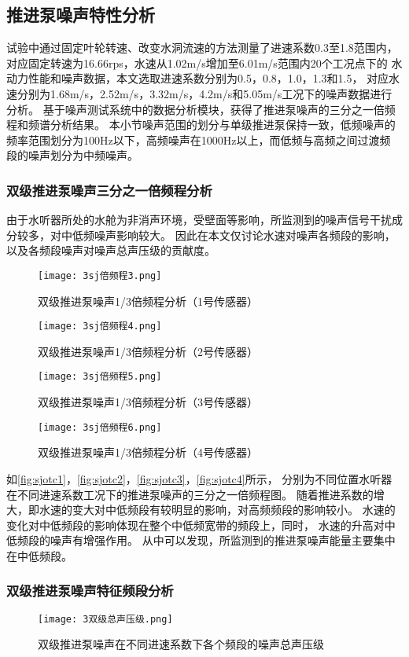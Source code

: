 \subsection{推进泵噪声特性分析}
试验中通过固定叶轮转速、改变水洞流速的方法测量了进速系数0.3至1.8范围内，
对应固定转速为16.66rps，水速从1.02m/s增加至6.01m/s范围内20个工况点下的
水动力性能和噪声数据，本文选取进速系数分别为0.5，0.8，1.0，1.3和1.5，
对应水速分别为1.68m/s，2.52m/s，3.32m/s，4.2m/s和5.05m/s工况下的噪声数据进行分析。
基于噪声测试系统中的数据分析模块，获得了推进泵噪声的三分之一倍频程和频谱分析结果。
本小节噪声范围的划分与单级推进泵保持一致，低频噪声的频率范围划分为100Hz以下，高频噪声在1000Hz以上，而低频与高频之间过渡频
段的噪声划分为中频噪声。
\subsubsection{双级推进泵噪声三分之一倍频程分析}
由于水听器所处的水舱为非消声环境，受壁面等影响，所监测到的噪声信号干扰成分较多，对中低频噪声影响较大。
因此在本文仅讨论水速对噪声各频段的影响，以及各频段噪声对噪声总声压级的贡献度。
\begin{figure}[htbp]
    \centering
    \texttt{[image: 3sj倍频程3.png]}
    \caption{\label{fig:sjotc1}双级推进泵噪声1/3倍频程分析（1号传感器）}
\end{figure}
\begin{figure}[htbp]
    \centering
    \texttt{[image: 3sj倍频程4.png]}
    \caption{\label{fig:sjotc2}双级推进泵噪声1/3倍频程分析（2号传感器）}
\end{figure}
\begin{figure}[htbp]
    \centering
    \texttt{[image: 3sj倍频程5.png]}
    \caption{\label{fig:sjotc3}双级推进泵噪声1/3倍频程分析（3号传感器）}
\end{figure}
\begin{figure}[htbp]
    \centering
    \texttt{[image: 3sj倍频程6.png]}
    \caption{\label{fig:sjotc4}双级推进泵噪声1/3倍频程分析（4号传感器）}
\end{figure}

如\autoref{fig:sjotc1}，\autoref{fig:sjotc2}，\autoref{fig:sjotc3}，\autoref{fig:sjotc4}所示，
分别为不同位置水听器在不同进速系数工况下的推进泵噪声的三分之一倍频程图。
随着推进系数的增大，即水速的变大对中低频段有较明显的影响，对高频频段的影响较小。
水速的变化对中低频段的影响体现在整个中低频宽带的频段上，同时，
水速的升高对中低频段的噪声有增强作用。
从中可以发现，所监测到的推进泵噪声能量主要集中在中低频段。
\subsubsection{双级推进泵噪声特征频段分析}
\begin{figure}[htbp]
    \centering
    \texttt{[image: 3双级总声压级.png]}
    \caption{\label{fig:djtotal}双级推进泵噪声在不同进速系数下各个频段的噪声总声压级}
\end{figure}

